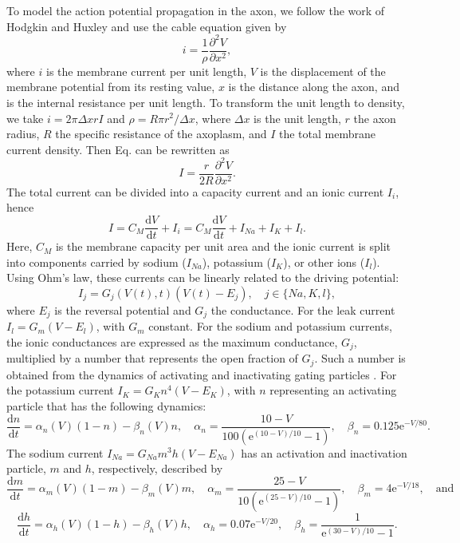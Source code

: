 \documentclass[11pt]{article}
\newcommand{\ee}{\mathrm{e}}
\begin{document}
To model the action potential propagation in the axon, we follow the work of Hodgkin and Huxley \cite{hodgkin1952quantitative} and use the cable equation given by
\begin{equation}\label{eq:i}
    i = \frac{1}{\rho} \frac{\partial^2 V}{\partial x^2},
\end{equation}
where $i$ is the membrane current per unit length, $V$ is the displacement of the membrane potential from its resting value, $x$ is the distance along the axon, and  is the internal resistance per unit length. To transform the unit length to density, we take $i = 2 \pi \Delta x r I$ and $\rho = R \pi r^2/\Delta x$, where $\Delta x$ is the unit length, $r$ the axon radius, $R$ the specific resistance of the axoplasm, and $I$ the total membrane current density. Then Eq.  can be rewritten as
\begin{equation}
    I = \frac{r}{2R} \frac{\partial^2 V}{\partial x^2}.
\end{equation}
The total current can be divided into a capacity current and an ionic current $I_i$, hence
\begin{equation}
    I = C_M \frac{\mathrm{d}V}{\mathrm{d}t} + I_i = C_M \frac{\mathrm{d}V}{\mathrm{d}t} + I_{Na} + I_K + I_l.
\end{equation}
Here, $C_M$ is the membrane capacity per unit area and the ionic current is split into components carried by sodium ($I_{Na}$), potassium ($I_K$), or other ions ($I_l$). Using Ohm’s law, these currents can be linearly related to the driving potential:
\begin{equation}
    I_j = G_j(V(t),t)(V(t)-E_j),  \quad   j \in \{Na,K,l\},
\end{equation}
where $E_j$ is the reversal potential and $G_j$ the conductance. For the leak current $I_l = G_m(V-E_l)$, with $G_m$ constant. For the sodium and potassium currents, the ionic conductances are expressed as the maximum conductance, $G_j$, multiplied by a number that represents the open fraction of $G_j$. Such a number is obtained from the dynamics of activating and inactivating gating particles \cite{hodgkin1952quantitative,koch2004biophysics}. For the potassium current $I_K=G_Kn^4(V-E_K)$, with $n$ representing an activating particle that has the following dynamics: 
\begin{equation}
    \frac{\mathrm{d}n}{\mathrm{d}t} = \alpha_n(V)(1-n) - \beta_n(V)n, \quad \alpha_n = \frac{10-V}{100(\ee^{(10-V)/10}-1)}, \quad \beta_n = 0.125\ee^{-V/80}.
\end{equation}
The sodium current $I_{Na}= G_{Na}m^3h(V-E_{Na})$ has an activation and inactivation particle, $m$ and $h$, respectively, described by
\begin{equation}
    \frac{\mathrm{d}m}{\mathrm{d}t} = \alpha_m(V)(1-m) - \beta_m(V)m, \quad \alpha_m = \frac{25-V}{10(\ee^{(25-V)/10}-1)}, \quad \beta_m = 4\ee^{-V/18}, \quad \text{and}
\end{equation}
\begin{equation}
    \frac{\mathrm{d}h}{\mathrm{d}t} = \alpha_h(V)(1-h) - \beta_h(V)h, \quad \alpha_h = 0.07\ee^{-V/20}, \quad \beta_h = \frac{1}{\ee^{(30-V)/10}-1}.
\end{equation}
\end{document}
